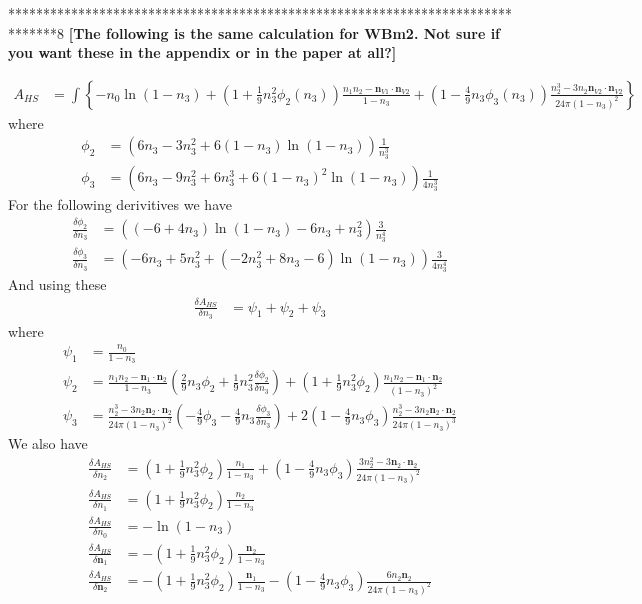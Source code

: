 \documentclass[letterpaper,twocolumn,amsmath,amssymb,jcp,10pt,aip]{revtex4-1}
\newcommand{\red}[1]{{\bf \color{red} #1}}
\newcommand{\fixme}[1]{\red{[#1]}}
\begin{document}
{*******************************************************************************8
\fixme{The following is the same calculation for WBm2.  Not sure if you want these in the appendix or in the paper at all?}
 
\begin{align} 
A_{HS} &= \int \left\{
    -n_0 \ln\left(1 - n_3\right)
    + \left(1 + \frac{1}{9}n_3^2 \phi_2(n_3)\right)   \frac{n_1 n_2 - \mathbf{n}_{V1} \cdot\mathbf{n}_{V2}}{1-n_3}
    + \left(1 - \frac{4}{9}n_3\phi_3(n_3)\right)\frac{n_2^3 - 3 n_2 \mathbf{n}_{V2} \cdot \mathbf{n}_{V2}}{24\pi (1-n_3)^2}
    \right\}
\end{align}
 where
 \begin{align}
   \phi_2 &= \left(6n_3 - 3n_3^2 + 6(1-n_3)\ln(1-n_3)\right)\frac{1}{n_3^3}\\
   \phi_3 &= \left(6n_3 - 9n_3^2 + 6n_3^3 + 6(1-n_3)^2 \ln(1-n_3)\right)\frac{1}{4n_3^3}
 \end{align}
For the following derivitives we have
\begin{align}
   \frac{\delta \phi_2}{\delta n_3} &= \left((-6+4n_3)\ln(1-n_3) - 6n_3 + n_3^2\right)\frac{3}{n_3^4}\\
   \frac{\delta \phi_3}{\delta n_3} &= \left(-6n_3 + 5n_3^2 + (-2n_3^2 + 8n_3 -6)\ln(1-n_3)\right)\frac{3}{4n_3^4}
 \end{align}
And using these
\begin{align}
  \frac{\delta A_{HS}}{\delta n_3} &= \psi _1 + \psi _2 + \psi _3
\end{align}
where
\begin{align}
  \psi_1 &= \frac{n_0}{1-n_3}\\
  \psi_2 &= \frac{n_1n_2 - \mathbf{n}_1\cdot \mathbf{n}_2}{1-n_3}\left(\frac{2}{9}n_3\phi_2 + \frac{1}{9}n_3^2\frac{\delta \phi_2}{\delta n_3}\right) + \left(1 + \frac{1}{9}n_3^2\phi_2\right)\frac{n_1n_2 - \mathbf{n}_1\cdot \mathbf{n}_2}{(1-n_3)^2}\\
  \psi_3 &= \frac{n_2^3 - 3n_2\mathbf{n}_2 \cdot \mathbf{n}_2}{24\pi(1-n_3)^2}\left(-\frac{4}{9}\phi_3 - \frac{4}{9}n_3\frac{\delta \phi_3}{\delta n_3}\right) + 2\left(1 - \frac{4}{9}n_3\phi_3\right)\frac{n_2^3 - 3n_2\mathbf{n}_2 \cdot \mathbf{n}_2}{24\pi(1-n_3)^3} 
\end{align}
We also have
\begin{align}
  \frac{\delta A_{HS}}{\delta n_2} &= (1 + \frac{1}{9}n_3^2\phi_2)\frac{n_1}{1-n_3} + (1 - \frac{4}{9}n_3\phi_3)\frac{3n_2^2 - 3\mathbf{n}_2 \cdot \mathbf{n}_2}{24\pi(1 - n_3)^2}\\
  \frac{\delta A_{HS}}{\delta n_1} &= (1 + \frac{1}{9}n_3^2\phi_2)\frac{n_2}{1 - n_3}\\
  \frac{\delta A_{HS}}{\delta n_0} &= -\ln(1 - n_3)\\
  \frac{\delta A_{HS}}{\delta \mathbf{n}_1} &= -(1 + \frac{1}{9}n_3^2 \phi_2)\frac{\mathbf{n}_2}{1 - n_3}\\
  \frac{\delta A_{HS}}{\delta \mathbf{n}_2} &= -(1 + \frac{1}{9}n_3^2\phi_2)\frac{\mathbf{n}_1}{1 - n_3} 
  - (1 - \frac{4}{9}n_3\phi_3)\frac{6n_2\mathbf{n}_2}{24\pi(1 - n_3)^2}
\end{align}




}
\end{document}
